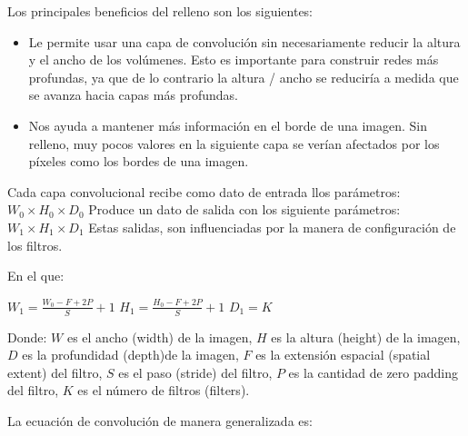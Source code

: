 \begin{enumerate}
				Los principales beneficios del relleno son los siguientes:
				\begin{itemize}
				\item Le permite usar una capa de convolución sin necesariamente reducir la altura y el ancho de los volúmenes. Esto es importante para construir redes más profundas, ya que de lo contrario la altura / ancho se reduciría a medida que se avanza hacia capas más profundas.
				\item Nos ayuda a mantener más información en el borde de una imagen. Sin relleno, muy pocos valores en la siguiente capa se verían afectados por los píxeles como los bordes de una imagen.
				\end{itemize}
			
		\end{enumerate}

		\noindent Cada capa convolucional recibe como dato de entrada llos parámetros:
		${W_{0}}\times{H_{0}}\times{D_{0}}$ \newline
		Produce un dato de salida con los siguiente parámetros: ${W_{1}}\times{H_{1}}\times{D_{1}}$\newline
		Estas salidas, son influenciadas por la manera de configuración de los filtros.\newline
		\vspace{-2em} 
		
		\begin{minipage}[t]{0.5\textwidth}
		En el que:
		\begingroup\makeatletter\def\f@size{12.4}\check@mathfonts
		\begin{center}
		 ${W_{1}} = \frac{{W_{0}} - F + 2P}{S} +1$ 
		\vskip 0.4cm 
		 ${H_{1}} = \frac{{H_{0}} - F + 2P}{S} +1$ 
		\vskip 0.4cm 
		 ${D_{1}} = K$ 
		 \end{center}
		\endgroup
		\end{minipage}
		\begin{minipage}[t]{0.55\textwidth}
		Donde:
		\vskip 0.1cm 
		$W$ es el ancho (width) de la imagen, \vskip 0.4cm  
		$H$ es la altura (height) de la imagen,\vskip 0.4cm 
		$D$ es la profundidad (depth)de la imagen,\vskip 0.4cm 
		$F$ es la extensión espacial (spatial extent) del filtro,\vskip 0.4cm 
		$S$ es el paso (stride) del filtro,\vskip 0.4cm 
		$P$ es la cantidad de zero padding del filtro,\vskip 0.4cm 
		$K$ es el número de filtros (filters).\vskip 0.4cm 
		\end{minipage}
		\vskip 0.4cm 
		\noindent La ecuación de convolución de manera generalizada es:
		
